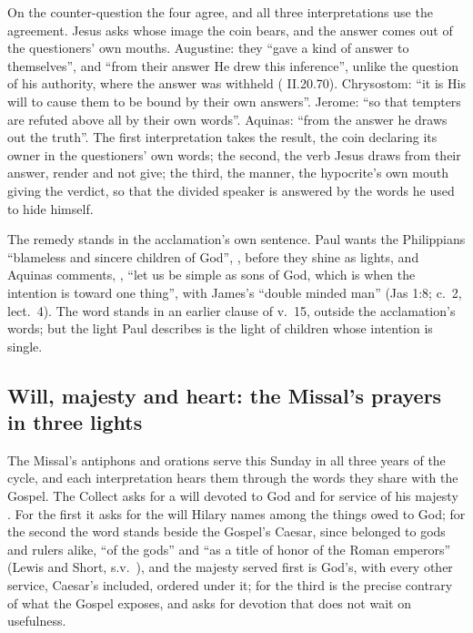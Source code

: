 On the counter-question the four agree, and all three interpretations use the
agreement. Jesus asks whose image the coin bears, and the answer comes out of
the questioners' own mouths. Augustine: they ``gave a kind of answer to
themselves'', and ``from their answer He drew this inference'', unlike the
question of his authority, where the answer was withheld ( II.20.70). Chrysostom: ``it is His will to cause them to be bound by
their own answers''. Jerome: ``so that tempters are refuted above
all by their own words''. Aquinas: ``from the answer he draws out the truth''.
The first
interpretation takes the result, the coin declaring its owner in the
questioners' own words; the second, the verb Jesus draws from their answer,
render and not give; the third, the manner, the hypocrite's own mouth giving
the verdict, so that the divided speaker is answered by the words he used to
hide himself.

The remedy stands in the acclamation's own sentence. Paul wants the
Philippians ``blameless and sincere children of God'', ,
before they shine as lights, and Aquinas comments, , ``let us be simple as sons
of God, which is when the intention is toward one thing'', with James's ``double
minded man'' (Jas 1:8;  c.~2, lect.~4). The word stands in
an earlier clause of v.~15, outside the acclamation's words; but the light Paul
describes is the light of children whose intention is single.

\subsection{Will, majesty and heart: the Missal's prayers in three lights}

The Missal's antiphons and orations serve this Sunday in all three years of the
cycle, and each interpretation hears them through the words they share with
the Gospel. The Collect asks for a will devoted to God  and for
service of his majesty . For the first it asks for the will
Hilary names among the things owed to God; for the second the word stands
beside the Gospel's Caesar, since  belonged to gods and rulers
alike, ``of the gods'' and ``as a title of honor of the Roman emperors'' (Lewis
and Short, s.v.\ ), and the majesty served first is God's,
with every other service, Caesar's included, ordered under it; for the third  is the precise contrary of what the
Gospel exposes, and  asks for devotion that does not wait on
usefulness.

